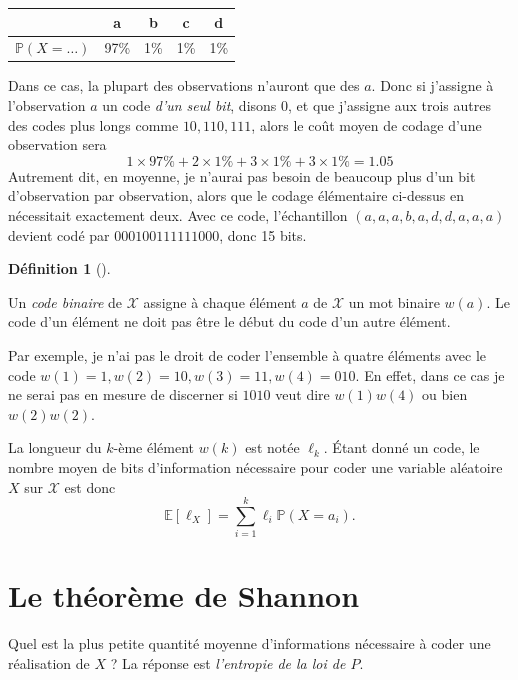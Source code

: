 \documentclass[
  10,
  letterpaper,
  DIV=11,
  numbers=noendperiod]{scrreport}
\theoremstyle{plain}
\theoremstyle{definition}
\theoremstyle{plain}
\theoremstyle{definition}
\newtheorem{definition}{Définition}[chapter]
\theoremstyle{definition}
\theoremstyle{plain}
\theoremstyle{remark}
\begin{document}
\begin{longtable}[]{@{}lcccc@{}}
\toprule\noalign{}
& a & b & c & d \\
\midrule\noalign{}
\endhead
\bottomrule\noalign{}
\endlastfoot
\(\mathbb{P}(X = …)\) & 97\% & 1\% & 1\% & 1\% \\
\end{longtable}

Dans ce cas, la plupart des observations n'auront que des \(a\). Donc si
j'assigne à l'observation \(a\) un code \emph{d'un seul bit}, disons 0,
et que j'assigne aux trois autres des codes plus longs comme
\(10, 110, 111\), alors le coût moyen de codage d'une observation sera
\[ 1\times 97\% + 2\times 1\% + 3 \times 1\% + 3\times 1\% = 1.05\]
Autrement dit, en moyenne, je n'aurai pas besoin de beaucoup plus d'un
bit d'observation par observation, alors que le codage élémentaire
ci-dessus en nécessitait exactement deux. Avec ce code, l'échantillon
\((a,a,a,b,a,d,d,a,a,a)\) devient codé par \(000100111111000\), donc 15
bits.

\begin{definition}[]\protect\hypertarget{def-code}{}\label{def-code}

Un \emph{code binaire} de \(\mathcal{X}\) assigne à chaque élément \(a\)
de \(\mathcal{X}\) un mot binaire \(w(a)\). Le code d'un élément ne doit
pas être le début du code d'un autre élément.

\end{definition}

Par exemple, je n'ai pas le droit de coder l'ensemble à quatre éléments
avec le code \(w(1)=1, w(2)=10, w(3)=11, w(4)=010\). En effet, dans ce
cas je ne serai pas en mesure de discerner si \(1010\) veut dire
\(w(1)w(4)\) ou bien \(w(2)w(2)\).

La longueur du \(k\)-ème élément \(w(k)\) est notée \(\ell_k\). Étant
donné un code, le nombre moyen de bits d'information nécessaire pour
coder une variable aléatoire \(X\) sur \(\mathcal{X}\) est donc
\[\mathbb{E}[\ell_X] = \sum_{i=1}^k \ell_i \mathbb{P}(X = a_i).\]

\hypertarget{le-thuxe9oruxe8me-de-shannon}{%
\section{Le théorème de Shannon}\label{le-thuxe9oruxe8me-de-shannon}}

Quel est la plus petite quantité moyenne d'informations nécessaire à
coder une réalisation de \(X\) ? La réponse est \emph{l'entropie de la
loi de \(P\)}.
\end{document}
